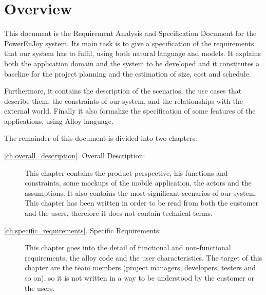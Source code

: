 \section{Overview}
This document is the Requirement Analysis and Specification Document for the PowerEnJoy system.
Its main task is to give a specification of the requirements that our system has to fulfil, using both natural language and models.
It explains both the application domain and the system to be developed and it constitutes a baseline for the project planning and the estimation of size, cost and schedule.

Furthermore, it contains the description of the scenarios, the use cases that describe them, the constraints of our system, and the relationships with the external world. Finally it also formalize the specification of some features of the applications, using Alloy language.

The remainder of this document is divided into two chapters:
\begin{description}
	\item [\autoref{ch:overall_description}. Overall Description:] This chapter contains the product perspective, his functions and constraints, some mockups of the mobile application, the actors and the assumptions. It also contains the most significant scenarios of our system.
	This chapter has been written in order to be read from both the customer and the users, therefore it does not contain technical terms.
	\item [\autoref{ch:specific_requirements}. Specific Requirements:] This chapter goes into the detail of functional and non-functional requirements, the alloy code and the user characteristics.
	The target of this chapter are the team members (project managers, developers, testers and so on), so it is not written in a way to be understood by the customer or the users.
\end{description}

